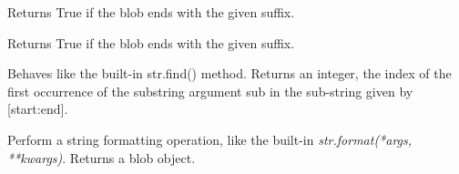 \documentclass[letterpaper,10pt,english]{sphinxmanual}
\begin{document}
\begin{fulllineitems}
\begin{fulllineitems}
\begin{quote}
\begin{description}
\end{description}\end{quote}

\end{fulllineitems}


\begin{fulllineitems}
\label{api_reference:textblob_de.blob.TextBlobDE.ends_with}
Returns True if the blob ends with the given suffix.

\end{fulllineitems}


\begin{fulllineitems}
\label{api_reference:textblob_de.blob.TextBlobDE.endswith}
Returns True if the blob ends with the given suffix.

\end{fulllineitems}


\begin{fulllineitems}
\label{api_reference:textblob_de.blob.TextBlobDE.find}
Behaves like the built-in str.find() method. Returns an integer,
the index of the first occurrence of the substring argument sub in the
sub-string given by {[}start:end{]}.

\end{fulllineitems}


\begin{fulllineitems}
\label{api_reference:textblob_de.blob.TextBlobDE.format}
Perform a string formatting operation, like the built-in
\emph{str.format(*args, **kwargs)}. Returns a blob object.

\end{fulllineitems}



\end{fulllineitems}
\end{document}
